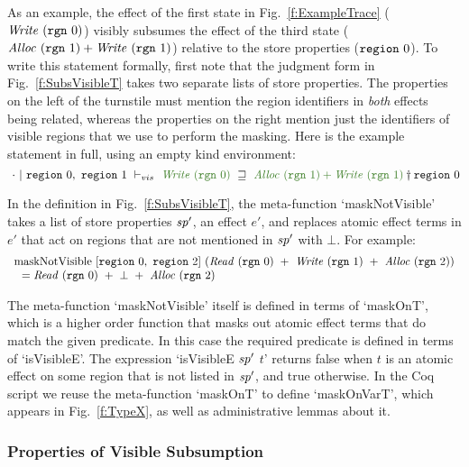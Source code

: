 As an example, the effect of the first state in Fig.~\ref{f:ExampleTrace} ($\mathit{Write}~(\texttt{rgn}~ 0)$) visibly subsumes the effect of the third state ($\mathit{Alloc}~(\texttt{rgn}~ 1) + \mathit{Write}~(\texttt{rgn}~ 1)$) relative to the store properties ($\texttt{region}~ 0$). To write this statement formally, first note that the judgment form in Fig.~\ref{f:SubsVisibleT} takes two separate lists of store properties. The properties on the left of the turnstile must mention the region identifiers in \emph{both} effects being related, whereas the properties on the right mention just the identifiers of visible regions that we use to perform the masking. Here is the example statement in full, using an empty kind environment:
$$
\SubsVisibleT
        {~\nil}
        {\sregion{0},~ \sregion{1}}
        {\sregion{0}}
        {\tcWrite~(\trgn{0})~}
        {~\tcAlloc~(\trgn{1}) + \tcWrite~(\trgn{1})}
$$

\noindent
In the definition in Fig.~\ref{f:SubsVisibleT}, the meta-function `maskNotVisible' takes a list of store properties $\mathit{sp}'$, an effect $e'$, and replaces atomic effect terms in $e'$ that act on regions that are not mentioned in $\mathit{sp}'$ with $\bot$. For example:
$$
\begin{array}{ll}
\textrm{maskNotVisible}~ 
        [\texttt{region}~ 0,~ \texttt{region}~ 2]~
        (\mathit{Read}~(\texttt{rgn}~ 0) ~+~ \mathit{Write}~(\texttt{rgn}~ 1) ~+~ \mathit{Alloc}~(\texttt{rgn}~ 2)) \\
~~ = \mathit{Read}~(\texttt{rgn}~ 0) ~+~ \bot ~+~ \mathit{Alloc}~(\texttt{rgn}~ 2)
\end{array}
$$

The meta-function `maskNotVisible' itself is defined in terms of `\mbox{maskOnT}', which is a higher order function that masks out atomic effect terms that do match the given predicate. In this case the required predicate is defined in terms of \mbox{`isVisibleE'}. The expression `isVisibleE $\mathit{sp}'$ $t$' returns false when $t$ is an atomic effect on some region that is not listed in $\mathit{sp}'$, and true otherwise. In the Coq script we reuse the meta-function `maskOnT' to define `maskOnVarT', which appears in Fig.~\ref{f:TypeX}, as well as administrative lemmas about it.





\subsubsection{Properties of Visible Subsumption}
\label{s:VisibleSubsumption}

